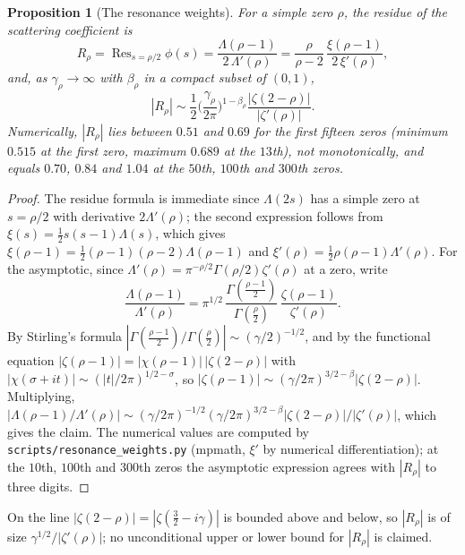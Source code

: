 \documentclass[11pt]{amsart}
\newtheorem{proposition}[theorem]{Proposition}
\theoremstyle{definition}
\theoremstyle{remark}
\newcommand{\half}{\tfrac12}
\DeclareMathOperator{\Res}{Res}
\begin{document}
\begin{proposition}[The resonance weights]\label{prop:weights}
For a simple zero $\rho$, the residue of the scattering coefficient is
\[
R_\rho=\Res_{s=\rho/2}\phi(s)=\frac{\Lambda(\rho-1)}{2\,\Lambda'(\rho)}
=\frac{\rho}{\rho-2}\,\frac{\xi(\rho-1)}{2\,\xi'(\rho)},
\]
and, as $\gamma_\rho\to\infty$ with $\beta_\rho$ in a compact subset of $(0,1)$,
\[
|R_\rho|\sim\frac12\Big(\frac{\gamma_\rho}{2\pi}\Big)^{1-\beta_\rho}
\frac{|\zeta(2-\rho)|}{|\zeta'(\rho)|}.
\]
Numerically, $|R_\rho|$ lies between $0.51$ and $0.69$ for the first fifteen zeros (minimum
$0.515$ at the first zero, maximum $0.689$ at the $13$th), not monotonically, and equals $0.70$, $0.84$ and $1.04$ at the $50$th, $100$th and $300$th zeros.
\end{proposition}
\begin{proof}
The residue formula is immediate since $\Lambda(2s)$ has a simple zero at $s=\rho/2$ with
derivative $2\Lambda'(\rho)$; the second expression follows from $\xi(s)=\half s(s-1)\Lambda(s)$,
which gives $\xi(\rho-1)=\half(\rho-1)(\rho-2)\Lambda(\rho-1)$ and
$\xi'(\rho)=\half\rho(\rho-1)\Lambda'(\rho)$. For the asymptotic, since
$\Lambda'(\rho)=\pi^{-\rho/2}\Gamma(\rho/2)\zeta'(\rho)$ at a zero, write
\[
\frac{\Lambda(\rho-1)}{\Lambda'(\rho)}=\pi^{1/2}\,
\frac{\Gamma(\frac{\rho-1}{2})}{\Gamma(\frac{\rho}{2})}\,\frac{\zeta(\rho-1)}{\zeta'(\rho)} .
\]
By Stirling's formula $|\Gamma(\frac{\rho-1}{2})/\Gamma(\frac\rho2)|\sim(\gamma/2)^{-1/2}$, and by
the functional equation $|\zeta(\rho-1)|=|\chi(\rho-1)|\,|\zeta(2-\rho)|$ with
$|\chi(\sigma+it)|\sim(|t|/2\pi)^{1/2-\sigma}$, so
$|\zeta(\rho-1)|\sim(\gamma/2\pi)^{3/2-\beta}|\zeta(2-\rho)|$. Multiplying,
$|\Lambda(\rho-1)/\Lambda'(\rho)|\sim(\gamma/2\pi)^{-1/2}(\gamma/2\pi)^{3/2-\beta}|\zeta(2-\rho)|/|\zeta'(\rho)|$,
which gives the claim. The numerical values are computed by
\texttt{scripts/resonance\_weights.py} (mpmath, $\xi'$ by numerical differentiation); at the
$10$th, $100$th and $300$th zeros the asymptotic expression agrees with $|R_\rho|$ to three
digits.
\end{proof}

On the line $|\zeta(2-\rho)|=|\zeta(\frac32-i\gamma)|$ is bounded above and below, so
$|R_\rho|$ is of size $\gamma^{1/2}/|\zeta'(\rho)|$; no unconditional upper or lower bound for
$|R_\rho|$ is claimed.
\end{document}
